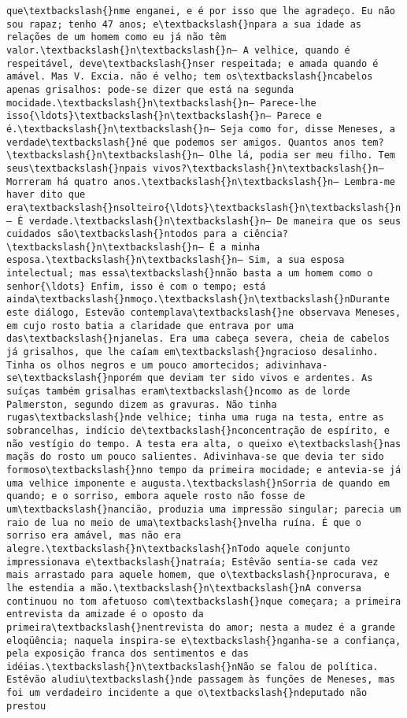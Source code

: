 \begin{Verbatim}[commandchars=\\\{\}]
que\textbackslash{}nme enganei, e é por isso que lhe agradeço. Eu não sou rapaz; tenho 47 anos; e\textbackslash{}npara a sua idade as relações de um homem como eu já não têm valor.\textbackslash{}n\textbackslash{}n— A velhice, quando é respeitável, deve\textbackslash{}nser respeitada; e amada quando é amável. Mas V. Excia. não é velho; tem os\textbackslash{}ncabelos apenas grisalhos: pode-se dizer que está na segunda mocidade.\textbackslash{}n\textbackslash{}n— Parece-lhe isso{\ldots}\textbackslash{}n\textbackslash{}n— Parece e é.\textbackslash{}n\textbackslash{}n— Seja como for, disse Meneses, a verdade\textbackslash{}né que podemos ser amigos. Quantos anos tem?\textbackslash{}n\textbackslash{}n— Olhe lá, podia ser meu filho. Tem seus\textbackslash{}npais vivos?\textbackslash{}n\textbackslash{}n— Morreram há quatro anos.\textbackslash{}n\textbackslash{}n— Lembra-me haver dito que era\textbackslash{}nsolteiro{\ldots}\textbackslash{}n\textbackslash{}n— É verdade.\textbackslash{}n\textbackslash{}n— De maneira que os seus cuidados são\textbackslash{}ntodos para a ciência?\textbackslash{}n\textbackslash{}n— É a minha esposa.\textbackslash{}n\textbackslash{}n— Sim, a sua esposa intelectual; mas essa\textbackslash{}nnão basta a um homem como o senhor{\ldots} Enfim, isso é com o tempo; está ainda\textbackslash{}nmoço.\textbackslash{}n\textbackslash{}nDurante este diálogo, Estevão contemplava\textbackslash{}ne observava Meneses, em cujo rosto batia a claridade que entrava por uma das\textbackslash{}njanelas. Era uma cabeça severa, cheia de cabelos já grisalhos, que lhe caíam em\textbackslash{}ngracioso desalinho. Tinha os olhos negros e um pouco amortecidos; adivinhava-se\textbackslash{}nporém que deviam ter sido vivos e ardentes. As suíças também grisalhas eram\textbackslash{}ncomo as de lorde Palmerston, segundo dizem as gravuras. Não tinha rugas\textbackslash{}nde velhice; tinha uma ruga na testa, entre as sobrancelhas, indício de\textbackslash{}nconcentração de espírito, e não vestígio do tempo. A testa era alta, o queixo e\textbackslash{}nas maçãs do rosto um pouco salientes. Adivinhava-se que devia ter sido formoso\textbackslash{}nno tempo da primeira mocidade; e antevia-se já uma velhice imponente e augusta.\textbackslash{}nSorria de quando em quando; e o sorriso, embora aquele rosto não fosse de um\textbackslash{}nancião, produzia uma impressão singular; parecia um raio de lua no meio de uma\textbackslash{}nvelha ruína. É que o sorriso era amável, mas não era alegre.\textbackslash{}n\textbackslash{}nTodo aquele conjunto impressionava e\textbackslash{}natraía; Estêvão sentia-se cada vez mais arrastado para aquele homem, que o\textbackslash{}nprocurava, e lhe estendia a mão.\textbackslash{}n\textbackslash{}nA conversa continuou no tom afetuoso com\textbackslash{}nque começara; a primeira entrevista da amizade é o oposto da primeira\textbackslash{}nentrevista do amor; nesta a mudez é a grande eloqüência; naquela inspira-se e\textbackslash{}nganha-se a confiança, pela exposição franca dos sentimentos e das idéias.\textbackslash{}n\textbackslash{}nNão se falou de política. Estêvão aludiu\textbackslash{}nde passagem às funções de Meneses, mas foi um verdadeiro incidente a que o\textbackslash{}ndeputado não prestou 
\end{Verbatim}
